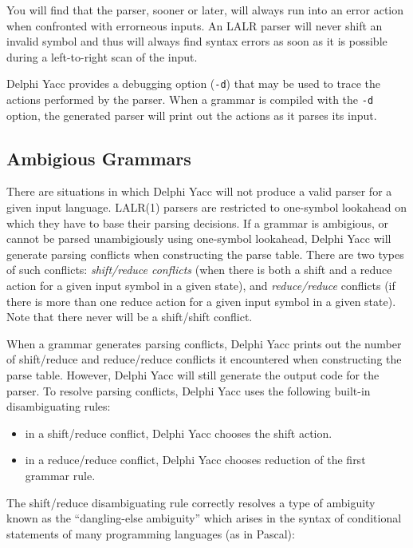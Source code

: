 \documentclass[a4paper]{article}
\begin{document}
You will find that the parser, sooner or later, will always run into an
error action when confronted with errorneous inputs. An LALR parser will
never shift an invalid symbol and thus will always find syntax errors as
soon as it is possible during a left-to-right scan of the input.

Delphi Yacc provides a debugging option (\verb"-d") that may be used to trace
the actions performed by the parser. When a grammar is compiled with the
\verb"-d" option, the generated parser will print out the actions as it
parses its input.

\subsection{Ambigious Grammars}

There are situations in which Delphi Yacc will not produce a valid parser for
a given input language. LALR(1) parsers are restricted to one-symbol
lookahead on which they have to base their parsing decisions. If a
grammar is ambigious, or cannot be parsed unambigiously using one-symbol
lookahead, Delphi Yacc will generate parsing conflicts when constructing the
parse table. There are two types of such conflicts: {\em shift/reduce
conflicts\/} (when there is both a shift and a reduce action for a given
input symbol in a given state), and {\em reduce/reduce\/} conflicts (if
there is more than one reduce action for a given input symbol in a given
state). Note that there never will be a shift/shift conflict.

When a grammar generates parsing conflicts, Delphi Yacc prints out the number
of shift/reduce and reduce/reduce conflicts it encountered when constructing
the parse table. However, Delphi Yacc will still generate the output code for the
parser. To resolve parsing conflicts, Delphi Yacc uses the following built-in
disambiguating rules:

\begin{itemize}
   \item
      in a shift/reduce conflict, Delphi Yacc chooses the shift action.
   \item
      in a reduce/reduce conflict, Delphi Yacc chooses reduction of the first
      grammar rule.
\end{itemize}

The shift/reduce disambiguating rule correctly resolves a type of
ambiguity known as the ``dangling-else ambiguity'' which arises in the
syntax of conditional statements of many programming languages (as in
Pascal):
\end{document}
